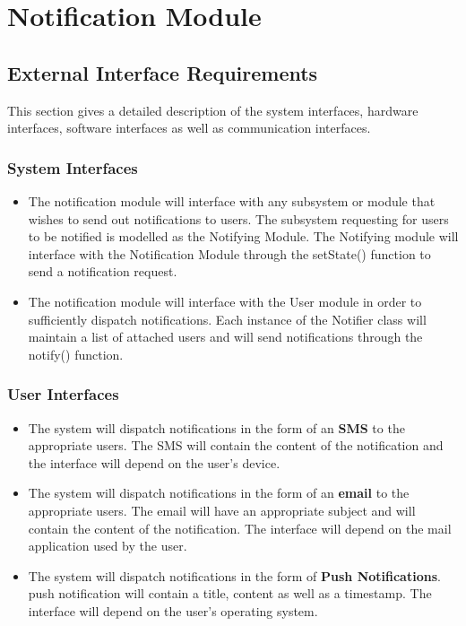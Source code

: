 \section{Notification Module}
\subsection{External Interface Requirements}
This section gives a detailed description of the system interfaces, hardware interfaces, software interfaces as well as communication interfaces.
\subsubsection{System Interfaces}
\begin{itemize}
	\item The notification module will interface with any subsystem or module that wishes to send out notifications to users. The subsystem requesting for users to be notified is modelled as the Notifying Module. The Notifying module will interface with the Notification Module through the setState() function to send a notification request. 
	
	\item The notification module will interface with the User module in order to sufficiently dispatch notifications. Each instance of the Notifier class will maintain a list of attached users and will send notifications through the notify() function.
\end{itemize}

\subsubsection{User Interfaces}
\begin{itemize}
	\item The system will dispatch notifications in the form of an \textbf{SMS} to the appropriate users. The SMS will contain the content of the notification and the interface will depend on the user's device.
	
	\item The system will dispatch notifications in the form of an \textbf{email} to the appropriate users. The email will have an appropriate subject and will contain the content of the notification. The interface will depend on the mail application used by the user.
	
	\item The system will dispatch notifications in the form of \textbf{Push Notifications}.  push notification will contain a title, content as well as a timestamp. The interface will depend on the user's operating system. 
\end{itemize}

